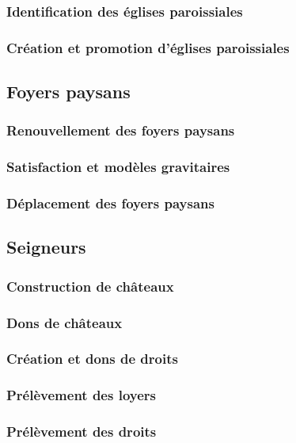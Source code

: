 	\subsubsection{Identification des églises paroissiales}
	\subsubsection{Création et promotion d'églises paroissiales}

\subsection{Foyers paysans}
	\subsubsection{Renouvellement des foyers paysans}
	\subsubsection{Satisfaction et modèles gravitaires}
	\subsubsection{Déplacement des foyers paysans}

\subsection{Seigneurs}
	\subsubsection{Construction de châteaux}
	\subsubsection{Dons de châteaux}
	\subsubsection{Création et dons de droits}
	\subsubsection{Prélèvement des loyers}
	\subsubsection{Prélèvement des droits}

\printbibliography[title={Références}]
